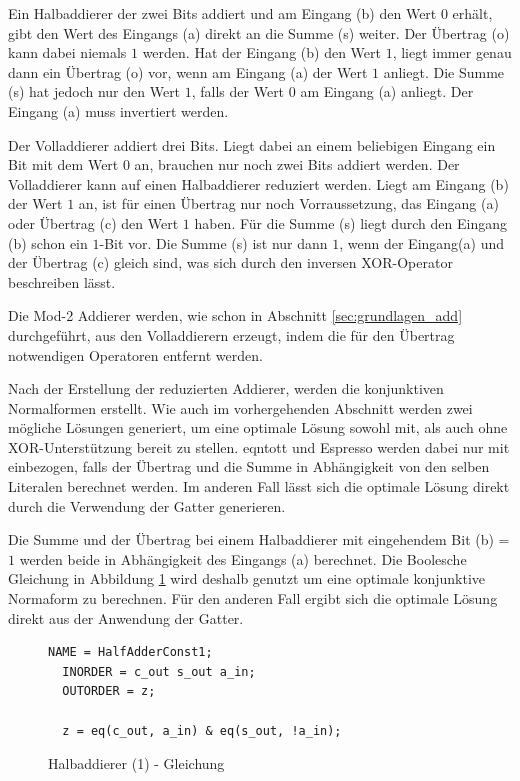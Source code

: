 Ein Halbaddierer der zwei Bits addiert und am Eingang (b) den Wert $0$ erhält, gibt den Wert des Eingangs (a) direkt an die Summe (s) weiter.
Der Übertrag (o) kann dabei niemals $1$ werden. Hat der Eingang (b) den Wert $1$, liegt immer genau dann ein Übertrag (o) vor, wenn am Eingang (a)
der Wert $1$ anliegt. Die Summe (s) hat jedoch nur den Wert $1$, falls der Wert $0$ am Eingang (a) anliegt. Der Eingang (a) muss invertiert werden.

Der Volladdierer addiert drei Bits. Liegt dabei an einem beliebigen Eingang ein Bit mit dem Wert $0$ an, brauchen nur noch zwei Bits addiert werden.
Der Volladdierer kann auf einen Halbaddierer reduziert werden. Liegt am Eingang (b) der Wert $1$ an, ist für einen Übertrag nur noch Vorraussetzung,
das Eingang (a) oder Übertrag (c) den Wert $1$ haben. Für die Summe (s) liegt durch den Eingang (b) schon ein $1$-Bit vor. Die Summe (s) ist nur dann
$1$, wenn der Eingang(a) und der Übertrag (c) gleich sind, was sich durch den inversen XOR-Operator beschreiben lässt.

Die Mod-2 Addierer werden, wie schon in Abschnitt \ref{sec:grundlagen_add} durchgeführt, aus den Volladdierern erzeugt, indem die für den Übertrag
notwendigen Operatoren entfernt werden.

Nach der Erstellung der reduzierten Addierer, werden die konjunktiven Normalformen erstellt. Wie auch im vorhergehenden Abschnitt werden zwei mögliche
Lösungen generiert, um eine optimale Lösung sowohl mit, als auch ohne XOR-Unterstützung bereit zu stellen. eqntott und Espresso werden dabei nur mit
einbezogen, falls der Übertrag und die Summe in Abhängigkeit von den selben Literalen berechnet werden. Im anderen Fall lässt sich die optimale Lösung
direkt durch die Verwendung der Gatter generieren.

Die Summe und der Übertrag bei einem Halbaddierer mit eingehendem Bit (b) = $1$ werden beide in Abhängigkeit des Eingangs (a) berechnet. Die Boolesche
Gleichung in Abbildung \ref{fig:halfadder1_qen} wird deshalb genutzt um eine optimale konjunktive Normaform zu berechnen. Für den anderen Fall ergibt
sich die optimale Lösung direkt aus der Anwendung der Gatter. \clearpage
\begin{figure}[!h]
  \centering
  \begin{lstlisting}[]
  NAME = HalfAdderConst1;
  INORDER = c_out s_out a_in;
  OUTORDER = z;

  z = eq(c_out, a_in) & eq(s_out, !a_in);
  \end{lstlisting}
  \caption{Halbaddierer (1) - Gleichung}
  \label{fig:halfadder1_qen}
\end{figure}

